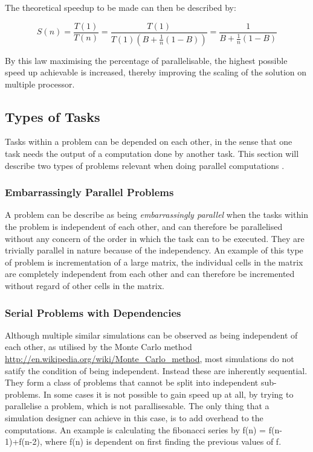 The theoretical speedup to be made can then be described by:

\begin{equation}
  S(n) = \frac{T(1)}{T(n)} = \frac{T(1)}{T(1)(B + \frac{1}{n} (1 - B))} = \frac{1}{B + \frac{1}{n} (1 - B)}
\end{equation}

By this law maximising the percentage of parallelisable, the highest possible speed up achievable is increased, thereby improving the scaling of the solution on multiple processor.

\subsection{Types of Tasks}\label{top}

Tasks within a problem can be depended on each other, in the sense that one task needs the output of a computation done by another task. This section will describe two types of problems relevant when doing parallel computations \cite{gribblelab,compLLNL}.

\subsubsection{Embarrassingly Parallel Problems}
A problem can be describe as being \emph{embarrassingly parallel} when the tasks within the problem is independent of each other, and can therefore be parallelised without any concern of the order in which the task can to be executed. They are trivially parallel in nature because of the independency. An example of this type of problem is incrementation of a large matrix, the individual cells in the matrix are completely independent from each other and can therefore be incremented without regard of other cells in the matrix.

\subsubsection{Serial Problems with Dependencies}
Although multiple similar simulations can be observed as being independent of each other, as utilised by the Monte Carlo method \url{http://en.wikipedia.org/wiki/Monte_Carlo_method}, most simulations do not satify the condition of being independent. Instead these are inherently sequential. They form a class of problems that cannot be split into independent sub-problems. In some cases it is not possible to gain speed up at all, by trying to parallelise a problem, which is not parallisesable. The only thing that a simulation designer can achieve in this case, is to add overhead to the computations. An example is calculating the fibonacci series by f(n) = f(n-1)+f(n-2), where f(n) is dependent on first finding the previous values of f.

